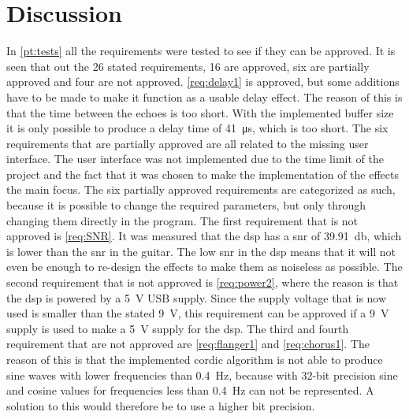 \section{Discussion}\label{sec:discussion}

In \autoref{pt:tests} all the requirements were tested to see if they can be approved. It is seen that out the 26 stated requirements, 16 are approved, six are partially approved and four are not approved.
\autoref{req:delay1} is approved, but some additions have to be made to make it function as a usable delay effect. The reason of this is that the time between the echoes is too short. With the implemented buffer size it is only possible to produce a delay time of \SI{41}{\micro\second}, which is too short. 
The six requirements that are partially approved are all related to the missing user interface. The user interface was not implemented due to the time limit of the project and the fact that it was chosen to make the implementation of the effects the main focus. The six partially approved requirements are categorized as such, because it is possible to change the required parameters, but only through changing them directly in the program. 
The first requirement that is not approved is \autoref{req:SNR}. It was measured that the \gls{dsp} has a \gls{snr} of \SI{39.91}{\decibel}, which is lower than the \gls{snr} in the guitar. The low \gls{snr} in the \gls{dsp} means that it will not even be enough to re-design the effects to make them as noiseless as possible.  
The second requirement that is not approved is \autoref{req:power2}, where the reason is that the \gls{dsp} is powered by a \SI{5}{\volt} USB supply. Since the supply voltage that is now used is smaller than the stated \SI{9}{\volt}, this requirement can be approved if a \SI{9}{\volt} supply is used to make a \SI{5}{\volt} supply for the \gls{dsp}.
The third and fourth requirement that are not approved are \autoref{req:flanger1} and \autoref{req:chorus1}. The reason of this is that the implemented \gls{cordic} algorithm is not able to produce sine waves with lower frequencies than \SI{0.4}{\hertz}, because with 32-bit precision sine and cosine values for frequencies less than \SI{0.4}{\hertz} can not be represented. A solution to this would therefore be to use a higher bit precision. \\

